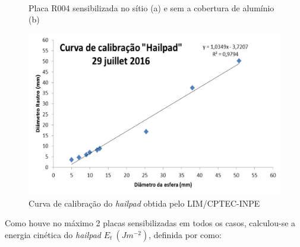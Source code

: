 \begin{figure}[htb]
	\begin{center}
		\caption{Placa R004 sensibilizada no sítio (a) e sem a cobertura de alumínio (b)} 
		\label{hailpad_exemplo}
		\quad
		\\
	\end{center}
\end{figure}

\begin{figure}[htb]
	\begin{center}
		\caption{Curva de calibração do \textit{hailpad} obtida pelo LIM/CPTEC-INPE} 
		\label{calibracao_hailpad}
		\includegraphics[width=0.7\columnwidth]{figs/calibracao_hailpad.png}
	\end{center}
\end{figure}

Como houve no máximo 2 placas sensibilizadas em todos os casos, calculou-se a energia cinética do \textit{hailpad} $E_t\:(Jm^{-2})$, definida por  como:

